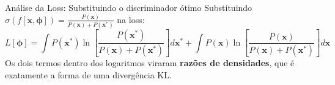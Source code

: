 \documentclass[aspectratio=169,xcolor=dvipsnames]{beamer}
\begin{document}
  \begin{frame}{Análise da Loss: Substituindo o discriminador ótimo}
    Substituindo $\sigma(f[\mathbf{x},\bm{\phi}]) = \frac{P(\mathbf{x})}{P(\mathbf{x})+P(\mathbf{x}^*)}$ na loss:
    \vspace{0.2em}
    \[
      L[\bm{\phi}] = \int P(\mathbf{x}^{*}) \ln\!\left[\frac{P(\mathbf{x}^{*})}{P(\mathbf{x})+P(\mathbf{x}^{*})}\right] d\mathbf{x}^{*}
      + \int P(\mathbf{x})\ln\!\left[\frac{P(\mathbf{x})}{P(\mathbf{x})+P(\mathbf{x}^{*})}\right] d\mathbf{x}
    \]
    \vspace{0.3em}
    Os dois termos dentro dos logaritmos viraram \textbf{razões de
    densidades}, que é exatamente a forma de uma divergência KL.
  \end{frame}
\end{document}
